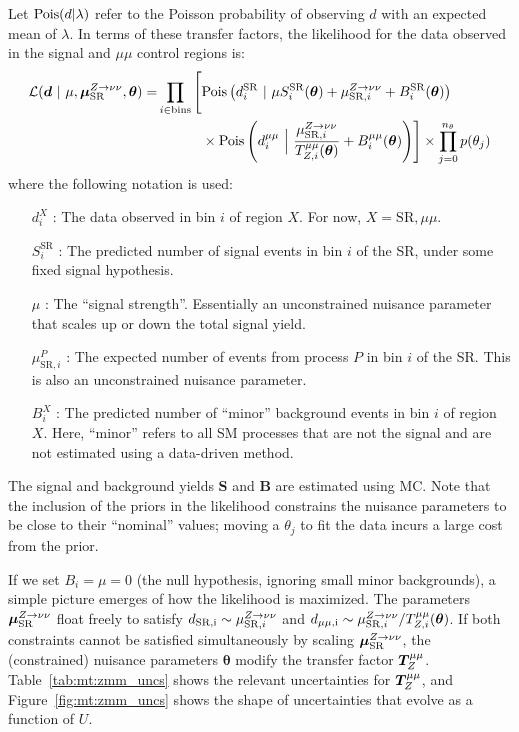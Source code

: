 Let $\mathrm{Pois}(d|\lambda)$ refer to the Poisson probability of observing $d$ with an expected mean of $\lambda$. 
In terms of these transfer factors, the likelihood for the data observed in the signal and $\mu\mu$ control regions is:
\begin{align}
    \mathcal{L}(\bm{d} ~|~ \mu,\muz,\bm{\theta}) = & \prod_{i\in\mathrm{bins}} \left[ 
    \pois\left(d^{\mathrm{SR}}_{i} ~|~ \mu S^{\mathrm{SR}}_{i}(\bm\theta)  + \muzi + B^{\mathrm{SR}}_{i}(\bm\theta)\right) \vphantom{\frac{\muzi}{\Ti{\mu\mu}{Z}(\bm\theta)}}\right. \nonumber \\
    & \left. \phantom{\prod_{i\in\mathrm{bins}}\Big[} \times \pois\left(d^{\mu\mu}_i~\Big|~ \frac{\muzi}{\Ti{\mu\mu}{Z}(\bm\theta)} + B^{\mu\mu}_i(\bm\theta) \right)\right]  \times  \prod_{j=0}^{n_\theta} p(\theta_j)
\end{align}
where the following notation is used:
\begin{itemize}
    \item[$d^X_i$]: The data observed in bin $i$ of region $X$. For now, $X=\mathrm{SR},\mu\mu$. 
    \item[$S^\mathrm{SR}_i$]: The predicted number of signal events in bin $i$ of the SR, under some fixed signal hypothesis. 
    \item[$\mu$]: The ``signal strength''. Essentially an unconstrained nuisance parameter that scales up or down the total signal yield. 
    \item[$\mu_{\mathrm{SR},i}^P$]: The expected number of events from process $P$ in bin $i$ of the SR. This is also an unconstrained nuisance parameter. 
    \item[$B^X_i$]: The predicted number of ``minor'' background events in bin $i$ of region $X$. Here, ``minor'' refers to all SM processes that are not the signal and are not estimated using a data-driven method. 
\end{itemize}
The signal and background yields $\bm{S}$ and $\bm{B}$ are estimated using MC.
Note that the inclusion of the priors in the likelihood constrains the nuisance parameters to be close to their ``nominal'' values; moving a $\theta_j$ to fit the data incurs a large cost from the prior.

If we set $B_i = \mu = 0$ (the null hypothesis, ignoring small minor backgrounds), a simple picture emerges of how the likelihood is maximized.
The parameters $\bm{\mu}_{\mathrm{SR}}^{Z\rightarrow\nu\nu}$ float freely to satisfy $d_\mathrm{SR,i} \sim \mu_{\mathrm{SR},i}^{Z\rightarrow\nu\nu}$ and $d_\mathrm{\mu\mu,i}\sim \mu_{\mathrm{SR},i}^{Z\rightarrow\nu\nu} / {T}^{\mu\mu}_{Z,i}(\bm\theta)$. 
If both constraints cannot be satisfied simultaneously by scaling $\bm{\mu}_{\mathrm{SR}}^{Z\rightarrow\nu\nu}$, the (constrained) nuisance parameters $\bm\theta$ modify the transfer factor $\bm{T}^{\mu\mu}_{Z}$. 
Table~\ref{tab:mt:zmm_uncs} shows the relevant uncertainties for $\bm{T}^{\mu\mu}_{Z}$, and Figure~\ref{fig:mt:zmm_uncs} shows the shape of uncertainties that evolve as a function of $U$.

